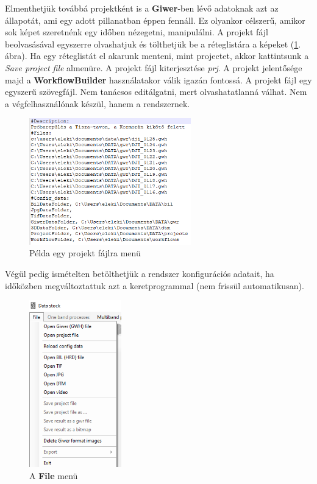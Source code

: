 \documentclass[a4paper,12pt]{article}
\begin{document}
Elmenthetjük továbbá projektként is a \textbf{Giwer}-ben lévő adatoknak azt az állapotát, ami egy adott pillanatban éppen fennáll. Ez olyankor célszerű, amikor sok képet szeretnénk egy időben nézegetni, manipulálni. A projekt fájl beolvasásával egyszerre olvashatjuk és tölthetjük be a réteglistára a képeket (\ref{fig:projectfile}. ábra). Ha egy réteglistát el akarunk menteni, mint projectet, akkor kattintsunk a \textit{Save project file} almenüre. A projekt fájl kiterjesztése \textit{prj}. A projekt jelentősége majd a \textbf{WorkflowBuilder} használatakor válik igazán fontossá. A projekt fájl egy egyszerű szövegfájl. Nem tanácsos editálgatni, mert olvashatatlanná válhat. Nem a végfelhasználónak készül, hanem a rendszernek.

\begin{figure}[h]
	\centering
	\includegraphics[width=7cm]{project_file}
	\caption{Példa egy projekt fájlra menü}
	\label{fig:projectfile}
\end{figure}

Végül pedig ismételten betölthetjük a rendszer konfigurációs adatait, ha időközben megváltoztattuk azt a keretprogrammal (nem frissül automatikusan).

\begin{figure}
	\centering
	\includegraphics[width=4cm]{filemenu_datastock.png}
	\caption{A \textbf{File} menü}
	\label{fig:filemenu_datastock}
\end{figure}
\end{document}
